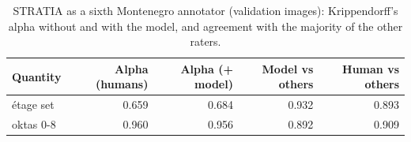 \begin{table}[t]
\centering
\footnotesize
\begin{tabular}{lrrrr}
\toprule
Quantity & Alpha (humans) & Alpha (+ model) & Model vs others & Human vs others \\
\midrule
étage set & 0.659 & 0.684 & 0.932 & 0.893 \\
oktas 0-8 & 0.960 & 0.956 & 0.892 & 0.909 \\
\bottomrule
\end{tabular}
\caption{STRATIA as a sixth Montenegro annotator (validation images): Krippendorff's alpha without and with the model, and agreement with the majority of the other raters.}
\label{tab:humanceiling}
\end{table}
